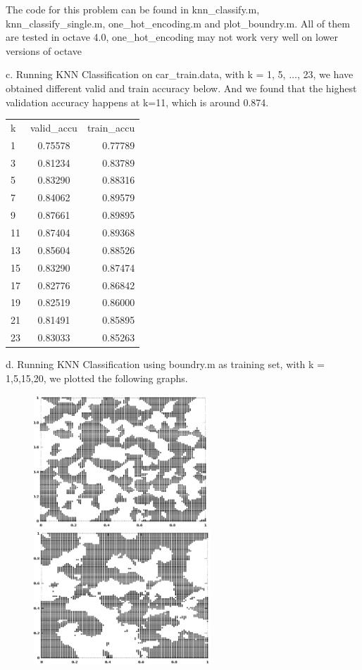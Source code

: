 \documentclass[12pt]{article}
\newenvironment{problem}[2][Problem]{\begin{trivlist}
\item[\hskip \labelsep {\bfseries #1}\hskip \labelsep {\bfseries #2}]}{\end{trivlist}}
\begin{document}
\begin{problem}{4. KNN Classification}
\item{The code for this problem can be found in knn\_classify.m, knn\_classify\_single.m, one\_hot\_encoding.m and plot\_boundry.m. All of them are tested in octave 4.0, one\_hot\_encoding may not work very well on lower versions of octave}
\item{c.} Running KNN Classification on car\_train.data, with k = 1, 5, $\dots$, 23, we have obtained
different valid and train accuracy below. And we found that the highest validation accuracy happens at k=11, which is around 0.874.
\begin{table} [htb]
\centering
\begin{tabular} {|l|c|r|}
k   & valid\_accu & train\_accu\\
1   & 0.75578  & 0.77789\\
3   & 0.81234  & 0.83789\\
5   & 0.83290  & 0.88316\\
7   & 0.84062  & 0.89579\\
9   & 0.87661  & 0.89895\\
11  & 0.87404  & 0.89368\\
13  & 0.85604  & 0.88526\\
15  & 0.83290  & 0.87474\\
17  & 0.82776  & 0.86842\\
19  & 0.82519  & 0.86000\\
21  & 0.81491  & 0.85895\\
23  & 0.83033  & 0.85263\\
\end{tabular}
\end{table}
\item{d.} Running KNN Classification using boundry.m as training set, with k = 1,5,15,20, we plotted the following graphs.\\
		\begin{figure}[h!]
			\includegraphics[height=5cm]{1.png}
			\includegraphics[height=5cm]{5.png}

\end{figure}
\end{problem}
\end{document}
